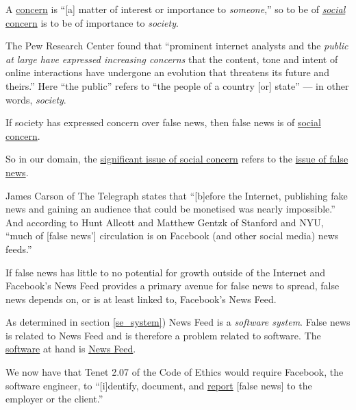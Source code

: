 \par A \ul{concern} is ``[a] matter of interest or importance to \emph{someone},'' \cite{oxford} so to be of \ul{\emph{social} concern} is to be of importance to \emph{society}.

\par The Pew Research Center found that ``prominent internet analysts and the \emph{public at large have expressed increasing concerns} that the content, tone and intent of online interactions have undergone an evolution that threatens its future and theirs.'' \cite{pew_future} Here ``the public'' refers to ``the people of a country [or] state'' \cite{merriam_webster} --- in other words, \emph{society}. \cite{oxford}

\par If society has expressed concern over false news, then false news is of \ul{social concern}.

\par So in our domain, the \ul{significant issue of social concern} refers to the \ul{issue of false news}.


\par James Carson of The Telegraph states that ``[b]efore the Internet, publishing fake news and gaining an audience that could be monetised was nearly impossible.'' \cite{telegraph_fn}  And according to Hunt Allcott and Matthew Gentzk of Stanford and NYU, ``much of [false news'] circulation is on Facebook (and other social media) news feeds.'' \cite{socialmedia_fn}

\par If false news has little to no potential for growth outside of the Internet and Facebook's News Feed provides a primary avenue for false news to spread, false news depends on, or is at least linked to, Facebook's News Feed.

\par As determined in section \ref{se_system}) News Feed is a \emph{software system}. False news is related to News Feed and is therefore a problem related to software. The \ul{software} at hand is \ul{News Feed}.


\par We now have that Tenet 2.07 of the Code of Ethics would require Facebook, the software engineer, to ``[i]dentify, document, and \ul{report} [false news] to the employer or the client.'' \cite{se_code}

